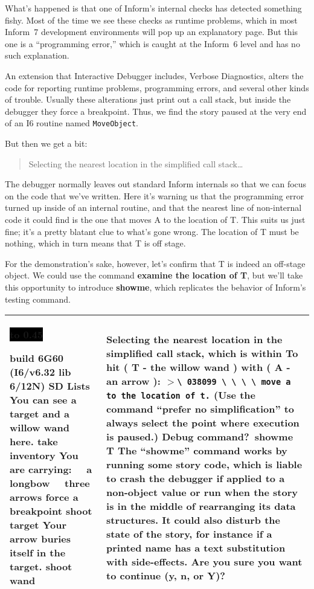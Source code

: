 \documentclass{book}
\newcommand{\n}{\hspace*{\fill}\newline}
\newcommand{\terp}[2]{\begin{center}\begin{tabular}{p{0.45\textwidth}|p{0.45\textwidth}}\midrule #1&#2\\\midrule\end{tabular}\end{center}}
\newcommand{\glkheading}[1]{\textbf{#1}}
\newcommand{\glkinput}[1]{\textbf{#1}}
\newcommand{\glkstatusline}[2]{\centerline{\colorbox{black}{\hbox to 0.45\textwidth{\textcolor{white}{#1\hfil #2}}}}}
\newcommand{\storyprompt}{\raisebox{1.5pt}{\(>\)}}
\newcommand{\cursor}{\raisebox{-1.5pt}{\RectangleThin}}
\newcommand{\markedindent}{\(>\)}
\begin{document}
What's happened is that one of Inform's internal checks has detected something
fishy.  Most of the time we see these checks as runtime problems, which in most
Inform~7 development environments will pop up an explanatory page.  But this one
is a ``programming error,'' which is caught at the Inform~6 level and has no
such explanation.

An extension that Interactive Debugger includes, Verbose Diagnostics, alters the
code for reporting runtime problems, programming errors, and several other kinds
of trouble.  Usually these alterations just print out a call stack, but inside
the debugger they force a breakpoint.  Thus, we find the story paused at the
very end of an I6 routine named \lstinline{MoveObject}.

But then we get a bit:

\begin{quote}
  Selecting the nearest location in the simplified call stack\dots
\end{quote}

The debugger normally leaves out standard Inform internals so that we can focus
on the code that we've written.  Here it's warning us that the programming error
turned up inside of an internal routine, and that the nearest line of
non-internal code it could find is the one that moves A to the location of T.
This suits us just fine; it's a pretty blatant clue to what's gone wrong.  The
location of T must be nothing, which in turn means that T is off stage.

For the demonstration's sake, however, let's confirm that T is indeed an
off-stage object.  We could use the command \glkinput{examine the location of
  T}, but we'll take this opportunity to introduce \glkinput{showme}, which
replicates the behavior of Inform's testing command.

\terp{\glkstatusline{Lists}{0/3}\n
  build 6G60 (I6/v6.32 lib 6/12N) SD\n
  \n
  \glkheading{Lists}\n
  You can see a target and a willow wand here.\n
  \n
  \storyprompt\glkinput{take inventory}\n
  You are carrying:\n
  \null\ \ a longbow\n
  \null\ \ three arrows\n
  \n
  \storyprompt\glkinput{force a breakpoint}\n
  \storyprompt\glkinput{shoot target}\n
  Your arrow buries itself in the target.\n
  \n
  \storyprompt\glkinput{shoot wand}\n
  \n
  [** Programming error: tried to ``move'' arrow to nothing **]}{%
  \n
  Selecting the nearest location in the simplified call stack, which is within To hit ( T - the willow wand ) with ( A - an arrow ):\n
  \markedindent \lstinline{\ 038099 \ \ \ \ move a to the location of t.}\n
  \n
  (Use the command ``prefer no simplification'' to always select the point where execution is paused.)\n
  \n
  Debug command?\ \glkinput{showme T}\n
  \n
  The ``showme'' command works by running some story code, which is liable to crash the debugger if applied to a non-object value or run when the story is in the middle of rearranging its data structures.  It could also disturb the state of the story, for instance if a printed name has a text substitution with side-effects.  Are you sure you want to continue (y, n, or Y)?\ \cursor}
\end{document}
